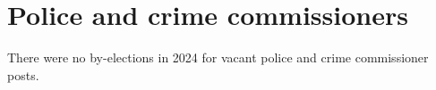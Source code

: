 \documentclass[a4paper,openany]{book}
\begin{document}
%
%

\section{Police and crime commissioners}

There were no by-elections in 2024 for vacant police and crime commissioner posts.
\end{document}
